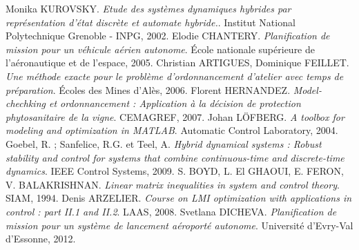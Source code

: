 \begin{thebibliography}{ABC}	
     Monika KUROVSKY. \emph{Etude des systèmes dynamiques hybrides par représentation d'état discrète et automate hybride.}. Institut National Polytechnique Grenoble - INPG, 2002.
     Elodie CHANTERY. \emph{Planification de mission pour un véhicule aérien autonome}. École nationale supérieure de l'aéronautique et de l'espace, 2005.
     Christian ARTIGUES, Dominique FEILLET. \emph{Une méthode exacte pour le problème d'ordonnancement d'atelier avec temps de préparation}. Écoles des Mines d'Alès, 2006.
     Florent HERNANDEZ. \emph{Model-chechking et ordonnancement : Application à la décision de protection phytosanitaire de la vigne}. CEMAGREF, 2007.
     Johan LÖFBERG. \emph{A toolbox for modeling and optimization in MATLAB}. Automatic Control Laboratory, 2004.
     Goebel, R. ; Sanfelice, R.G. et Teel, A. \emph{Hybrid dynamical systems : Robust stability and control for systems that combine continuous-time and discrete-time dynamics}. IEEE Control Systems, 2009.
     S. BOYD, L. El GHAOUI, E. FERON, V. BALAKRISHNAN. \emph{Linear matrix inequalities in system and control theory}. SIAM, 1994.
	 Denis ARZELIER. \emph{Course on LMI optimization with applications in control : part II.1 and II.2}. LAAS, 2008.
	 Svetlana DICHEVA. \emph{Planification de mission pour un système de lancement aéroporté autonome}. Université d’Evry-Val d’Essonne, 2012.
\end{thebibliography}


